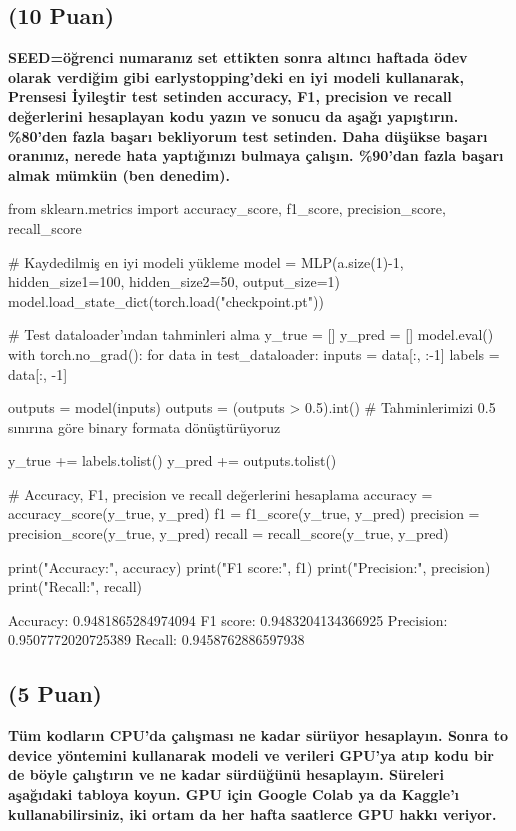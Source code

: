 \documentclass[11pt]{article}
\begin{document}
\subsection{(10 Puan)} \textbf{SEED=öğrenci numaranız set ettikten sonra altıncı haftada ödev olarak verdiğim gibi earlystopping'deki en iyi modeli kullanarak, Prensesi İyileştir test setinden accuracy, F1, precision ve recall değerlerini hesaplayan kodu yazın ve sonucu da aşağı yapıştırın. \%80'den fazla başarı bekliyorum test setinden. Daha düşükse başarı oranınız, nerede hata yaptığınızı bulmaya çalışın. \%90'dan fazla başarı almak mümkün (ben denedim).}

\begin{python}
from sklearn.metrics import accuracy_score, f1_score, precision_score, recall_score

# Kaydedilmiş en iyi modeli yükleme
model = MLP(a.size(1)-1, hidden_size1=100, hidden_size2=50, output_size=1)
model.load_state_dict(torch.load("checkpoint.pt"))

# Test dataloader'ından tahminleri alma
y_true = []
y_pred = []
model.eval()
with torch.no_grad():
    for data in test_dataloader:
        inputs = data[:, :-1]
        labels = data[:, -1]

        outputs = model(inputs)
        outputs = (outputs > 0.5).int() # Tahminlerimizi 0.5 sınırına göre binary formata dönüştürüyoruz

        y_true += labels.tolist()
        y_pred += outputs.tolist()

# Accuracy, F1, precision ve recall değerlerini hesaplama
accuracy = accuracy_score(y_true, y_pred)
f1 = f1_score(y_true, y_pred)
precision = precision_score(y_true, y_pred)
recall = recall_score(y_true, y_pred)

print("Accuracy:", accuracy)
print("F1 score:", f1)
print("Precision:", precision)
print("Recall:", recall)
\end{python}

Accuracy: 0.9481865284974094
F1 score: 0.9483204134366925
Precision: 0.9507772020725389
Recall: 0.9458762886597938


\subsection{(5 Puan)} \textbf{Tüm kodların CPU'da çalışması ne kadar sürüyor hesaplayın. Sonra to device yöntemini kullanarak modeli ve verileri GPU'ya atıp kodu bir de böyle çalıştırın ve ne kadar sürdüğünü hesaplayın. Süreleri aşağıdaki tabloya koyun. GPU için Google Colab ya da Kaggle'ı kullanabilirsiniz, iki ortam da her hafta saatlerce GPU hakkı veriyor.}
\end{document}
